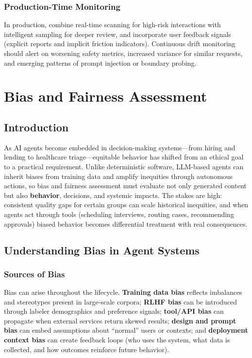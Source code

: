 \begin{TNtwocol}
\subsubsection*{Production-Time Monitoring}
In production, combine real-time scanning for high-risk interactions with intelligent sampling for deeper review, and incorporate user feedback signals (explicit reports and implicit friction indicators). Continuous drift monitoring should alert on worsening safety metrics, increased variance for similar requests, and emerging patterns of prompt injection or boundary probing.
\section{Bias and Fairness Assessment}
\label{sec:bias-fairness-assessment}

\subsection*{Introduction}
As AI agents become embedded in decision-making systems---from hiring and lending to healthcare triage---equitable behavior has shifted from an ethical goal to a practical requirement. Unlike deterministic software, LLM-based agents can inherit biases from training data and amplify inequities through autonomous actions, so bias and fairness assessment must evaluate not only generated content but also \textbf{behavior}, decisions, and systemic impacts. The stakes are high: consistent quality gaps for certain groups can scale historical inequities, and when agents act through tools (scheduling interviews, routing cases, recommending approvals) biased behavior becomes differential treatment with real consequences.

\subsection*{Understanding Bias in Agent Systems}

\subsubsection*{Sources of Bias}
Bias can arise throughout the lifecycle. \textbf{Training data bias} reflects imbalances and stereotypes present in large-scale corpora; \textbf{RLHF bias} can be introduced through labeler demographics and preference signals; \textbf{tool/API bias} can propagate when external services return skewed results; \textbf{design and prompt bias} can embed assumptions about ``normal'' users or contexts; and \textbf{deployment context bias} can create feedback loops (who uses the system, what data is collected, and how outcomes reinforce future behavior).


\end{TNtwocol}
